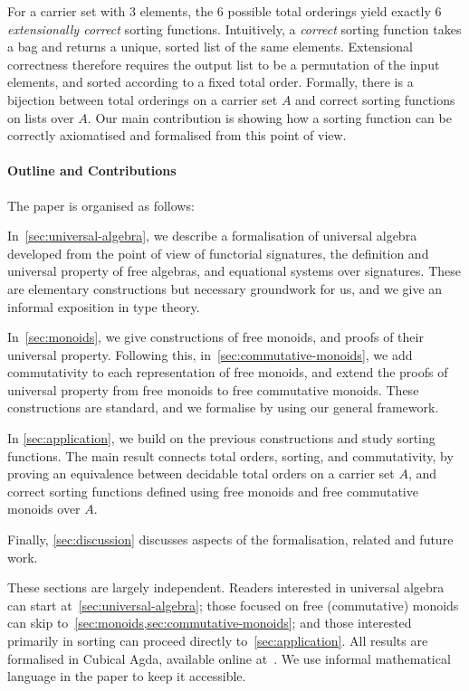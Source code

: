 For a carrier set with 3 elements, the 6 possible total orderings yield exactly 6 \textit{extensionally correct} sorting functions. 
Intuitively, a \emph{correct} sorting function takes a bag and returns a unique, sorted list of the same elements. 
Extensional correctness therefore requires the output list to be a permutation of the input elements, and sorted according to a fixed total order. 
Formally, there is a bijection between total orderings on a carrier set $A$ and correct sorting functions on lists over $A$. 
Our main contribution is showing how a sorting function can be correctly axiomatised and formalised from this point of view.

\paragraph*{Outline and Contributions}

The paper is organised as follows:
\begin{myitemize}
  \item In~\cref{sec:universal-algebra}, we describe a formalisation of universal algebra developed from the point of view
        of functorial signatures, the definition and universal property of free algebras,
        and equational systems over signatures.
        These are elementary constructions but necessary groundwork for us,
        and we give an informal exposition in type theory.
  \item In~\cref{sec:monoids}, we give constructions of free monoids, and proofs of their universal property.
        Following this, in~\cref{sec:commutative-monoids}, we add commutativity to each representation of free monoids,
        and extend the proofs of universal property from free monoids to free commutative monoids.
        These constructions are standard, and we formalise by using our general framework.
  \item In \cref{sec:application}, we build on the previous constructions and study sorting functions.
        The main result connects total orders, sorting, and commutativity,
        by proving an equivalence between decidable total orders on a carrier set $A$,
        and correct sorting functions defined using free monoids and free commutative monoids over $A$.
  \item Finally, \cref{sec:discussion} discusses aspects of the formalisation, related and future work.
\end{myitemize}
%
These sections are largely independent. Readers interested in universal algebra can start at~\cref{sec:universal-algebra}; those focused on free (commutative) monoids can skip to~\cref{sec:monoids,sec:commutative-monoids}; and those interested primarily in sorting can proceed directly to~\cref{sec:application}.
%
All results are formalised in Cubical Agda, available online at~\cite{choudhuryAgdasymmetries2025}.
We use informal mathematical language in the paper to keep it accessible.


